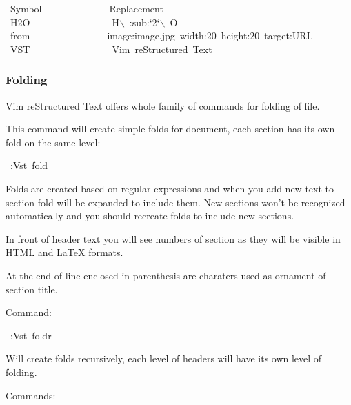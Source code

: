 \documentclass[12pt]{article}
\begin{document}
\begin{ttfamily}\begin{flushleft}
\mbox{~Symbol~~~~~~~~~~~~~~Replacement}\\
\mbox{~H2O~~~~~~~~~~~~~~~~~H$\backslash$~:sub:`2`$\backslash$~O}\\
\mbox{~from~~~~~~~~~~~~~~~~image:image.jpg~width:20~height:20~target:URL}\\
\mbox{~VST~~~~~~~~~~~~~~~~~Vim~reStructured~Text}\\
\end{flushleft}\end{ttfamily}

\hypertarget{lfolding}{}
\subsubsection{Folding}

Vim reStructured Text offers whole family of commands for folding of file.

This command will create simple folds for document, each section has its own
fold on the same level:

\begin{ttfamily}\begin{flushleft}
\mbox{~:Vst~fold}\\
\end{flushleft}\end{ttfamily}

Folds are created based on regular expressions and when you add new text to
section fold will be expanded to include them. New sections won't be
recognized automatically and you should recreate folds to include new
sections.

In front of header text you will see numbers of section as they will be
visible in HTML and \LaTeX{} formats.

At the end of line enclosed in parenthesis are charaters used as ornament of
section title.

Command:

\begin{ttfamily}\begin{flushleft}
\mbox{~:Vst~foldr}\\
\end{flushleft}\end{ttfamily}

Will create folds recursively, each level of headers will have its own level
of folding.

Commands:
\end{document}
